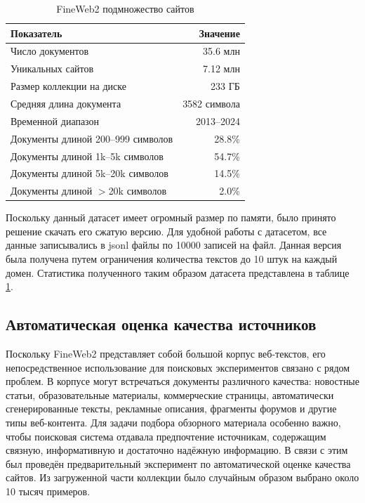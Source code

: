 \documentclass[oneside,senior,etd]{BYUPhys}
\begin{document}
\begin{table}[h]
    \centering
    \begin{tabular}{|l|r|}
        \hline
        \textbf{Показатель} & \textbf{Значение} \\
        \hline
        Число документов & 35.6 млн \\
        Уникальных сайтов & 7.12 млн \\
        Размер коллекции на диске & 233 ГБ \\
        Средняя длина документа & 3582 символа \\
        Временной диапазон & 2013--2024 \\
        \hline
        Документы длиной 200--999 символов & 28.8\% \\
        Документы длиной 1k--5k символов & 54.7\% \\
        Документы длиной 5k--20k символов & 14.5\% \\
        Документы длиной $>$20k символов & 2.0\% \\
        \bottomrule
    \end{tabular}
    \caption{FineWeb2 подмножество сайтов}
    \label{tab:fineweb2_small}
\end{table}

Поскольку данный датасет имеет огромный размер по памяти, было принято решение скачать его сжатую версию.
Для удобной работы с датасетом, все данные записывались в jsonl файлы по 10000 записей на файл.
Данная версия была получена путем ограничения количества текстов до 10 штук на каждый домен.
Статистика полученного таким образом датасета представлена в таблице \ref{tab:fineweb2_small}.

\subsection{Автоматическая оценка качества источников}

Поскольку FineWeb2 представляет собой большой корпус веб-текстов, его непосредственное использование для поисковых экспериментов связано с рядом проблем. 
В корпусе могут встречаться документы различного качества: новостные статьи, образовательные материалы, коммерческие страницы, автоматически сгенерированные тексты, рекламные описания, фрагменты форумов и другие типы веб-контента. 
Для задачи подбора обзорного материала особенно важно, чтобы поисковая система отдавала предпочтение источникам, содержащим связную, информативную и достаточно надёжную информацию.
В связи с этим был проведён предварительный эксперимент по автоматической оценке качества сайтов. 
Из загруженной части коллекции было случайным образом выбрано около 10 тысяч примеров. 
\end{document}
